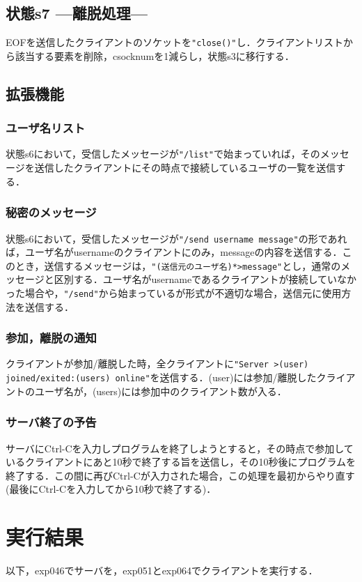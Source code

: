 \documentclass[a4j,10pt,titlepage]{jsarticle}
\begin{document}
\subsection{状態s7 ---離脱処理---}
EOFを送信したクライアントのソケットを\verb|"close()"|し．クライアントリストから該当する要素を削除，csocknumを1減らし，状態s3に移行する．

\subsection{拡張機能}\label{sec:extsrv}
\subsubsection{ユーザ名リスト}
状態s6において，受信したメッセージが\verb|"/list"|で始まっていれば，そのメッセージを送信したクライアントにその時点で接続しているユーザの一覧を送信する．

\subsubsection{秘密のメッセージ}
状態s6において，受信したメッセージが\verb|"/send username message"|の形であれば，ユーザ名がusernameのクライアントにのみ，messageの内容を送信する．このとき，送信するメッセージは，\verb|"(送信元のユーザ名)*>message"|とし，通常のメッセージと区別する．ユーザ名がusernameであるクライアントが接続していなかった場合や，\verb|"/send"|から始まっているが形式が不適切な場合，送信元に使用方法を送信する．

\subsubsection{参加，離脱の通知}
クライアントが参加/離脱した時，全クライアントに\verb|"Server >(user) joined/exited:(users) online"|を送信する．(user)には参加/離脱したクライアントのユーザ名が，(users)には参加中のクライアント数が入る．

\subsubsection{サーバ終了の予告}
サーバにCtrl-Cを入力しプログラムを終了しようとすると，その時点で参加しているクライアントにあと10秒で終了する旨を送信し，その10秒後にプログラムを終了する．この間に再びCtrl-Cが入力された場合，この処理を最初からやり直す(最後にCtrl-Cを入力してから10秒で終了する)．

\section{実行結果}
以下，exp046でサーバを，exp051とexp064でクライアントを実行する．
\end{document}
